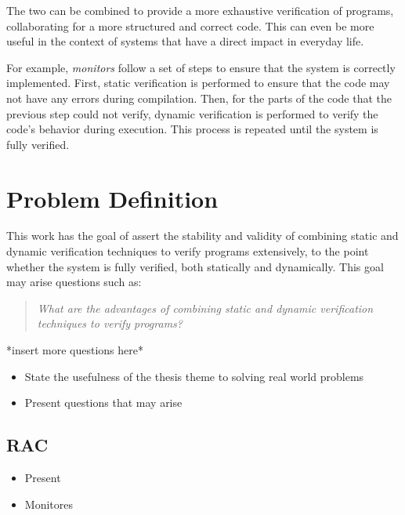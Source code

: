 The two can  be combined to provide a more exhaustive verification of \ocaml programs, 
collaborating for a more structured and correct code. This can even be more useful in the context of 
systems that have a direct impact in everyday life.

For example, \textit{monitors} follow a set of steps to ensure that the system is correctly implemented. 
First, static verification is performed to ensure that the code may not have any errors during compilation.
Then, for the parts of the code that the previous step could not verify, dynamic verification is performed 
to verify the code's behavior during execution. This process is repeated until the system is fully verified.

\section{Problem Definition}
\label{sec:problem_definition}

This work has the goal of assert the stability and validity of combining static and dynamic verification techniques 
to verify \ocaml programs extensively, to the point whether the system is fully verified, both statically and dynamically.
This goal may arise questions such as:

\begin{quote}
    \emph{What are the advantages of combining static and dynamic verification techniques to verify \ocaml programs?}
\end{quote}

*insert more questions here*

\begin{itemize}
    \item State the usefulness of the thesis theme to solving real world problems
    \item Present questions that may arise
\end{itemize}

\subsection{RAC}
\label{sub:rac}

\begin{itemize}
    \item Present \rac
\end{itemize}

\begin{itemize}
    \item Monitores
\end{itemize}

